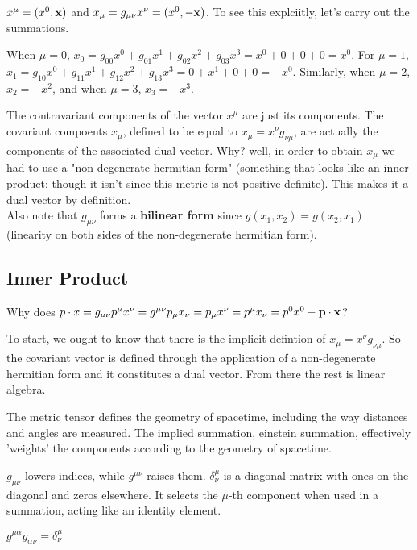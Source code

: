 $x^\mu = (x^0, \boldsymbol{\mathbf{x}})$ and $x_\mu = g_{\mu\nu} x^\nu = (x^0, -\boldsymbol{\mathbf{x}})$.
To see this explciitly, let's carry out the summations.

When $\mu = 0$, $x_0 = g_{00}x^0 + g_{01}x^1 + g_{02}x^2 + g_{03}x^3 = x^0 + 0 + 0 +0 = x^0$.
For $\mu = 1$, $x_1 = g_{10}x^0 + g_{11}x^1 + g_{12}x^2 + g_{13}x^3 = 0 + x^1 + 0 +0 = -x^0$.
Similarly, when $\mu = 2$, $x_2 = -x^2$, and when $\mu =3$, $x_3 = -x^3$.

The contravariant components of the vector $x^\mu$ are just its components.
The covariant compoents $x_\mu$, defined to be equal to $x_\mu = x^\nu g_{\nu\mu}$, are actually the components
of the associated dual vector.
Why? well, in order to obtain $x_\mu$ we had to use a "non-degenerate hermitian form"
(something that looks like an inner product; though it isn't since this metric is not positive definite).
This makes it a dual vector by definition.
\\

Also note that $g_{\mu\nu}$ forms a \textbf{bilinear form} since $g(x_1, x_2) = g(x_2, x_1)$
(linearity on both sides of the non-degenerate hermitian form).


\subsection{Inner Product}

Why does $p \cdot x = g_{\mu\nu} p^\mu x^\nu = g^{\mu\nu} p_\mu x_\nu = p_\mu x^\nu = p^\mu x_\nu = p^0 x^0 - \boldsymbol{\mathbf{p}}\cdot\boldsymbol{\mathbf{x}}$?

To start, we ought to know that there is the implicit defintion of
$x_\mu = x^\nu g_{\nu\mu}$.
So the covariant vector is defined through the application of a non-degenerate hermitian form
and it constitutes a dual vector.
From there the rest is linear algebra.

The metric tensor defines the geometry of spacetime, including the way distances and angles are measured.
The implied summation, einstein summation, effectively 'weights' the components according to the geometry of spacetime.

$g_{\mu\nu}$ lowers indices, while $g^{\mu\nu}$ raises them.
$\delta^{\mu}_{\nu}$ is a diagonal matrix with ones on the diagonal and zeros elsewhere.
It selects the $\mu$-th component when used in a summation, acting like an identity element.

$g^{\mu\alpha} g_{\alpha\nu} = \delta^{\mu}_{\nu}$

